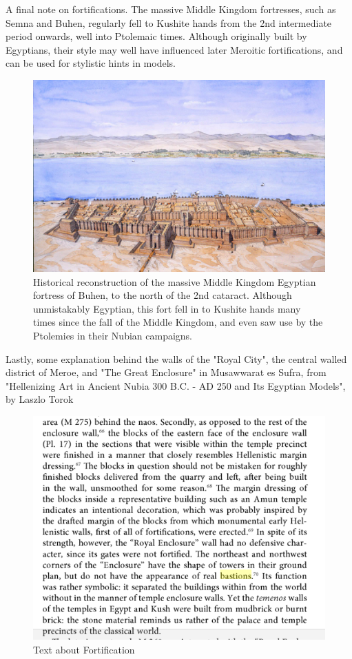 \documentclass[a4paper,12pt]{scrreprt}
\begin{document}
A final note on fortifications. The massive Middle Kingdom fortresses, such as Semna and Buhen, regularly fell to Kushite hands from the 2nd intermediate period onwards, well into Ptolemaic times. Although originally built by Egyptians, their style may well have influenced later Meroitic fortifications, and can be used for stylistic hints in models.

\begin{figure}[H]
	\centering
	\includegraphics[width=\textwidth]{img/fortress/reconstruction_fortress_of_buhen}
	\caption{Historical reconstruction of the massive Middle Kingdom Egyptian fortress of Buhen, to the north of the 2nd cataract. Although unmistakably Egyptian, this fort fell in to Kushite hands many times since the fall of the Middle Kingdom, and even saw use by the Ptolemies in their Nubian campaigns.}
\end{figure}

Lastly, some explanation behind the walls of the "Royal City", the central walled district of Meroe, and "The Great Enclosure" in Musawwarat es Sufra, from "Hellenizing Art in Ancient Nubia 300 B.C. - AD 250 and Its Egyptian Models", by Laszlo Torok  

\begin{figure}[H]
	\centering
	\includegraphics[width=\textwidth]{img/fortress/text_fortification}
	\caption{Text about Fortification}
\end{figure}
\end{document}
